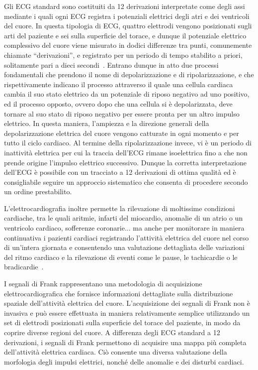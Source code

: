 \documentclass[12pt,italian]{report}
\begin{document}
Gli ECG standard sono costituiti da 12 derivazioni interpretate come degli assi mediante i quali ogni ECG registra i potenziali elettrici degli atri e dei ventricoli del cuore. In questa tipologia di ECG, quattro elettrodi vengono posizionati sugli arti del paziente e sei sulla superficie del torace, e dunque il potenziale elettrico complessivo del cuore viene misurato in dodici differenze tra punti, comunemente chiamate ``derivazioni'', e registrato per un periodo di tempo stabilito a priori, solitamente pari a dieci secondi~\cite{ecg}. Entrano dunque in atto due processi fondamentali che prendono il nome di depolarizzazione e di ripolarizzazione, e che rispettivamente indicano il processo attraverso il quale una cellula cardiaca cambia il suo stato elettrico da un potenziale di riposo negativo ad uno positivo, ed il processo opposto, ovvero dopo che una cellula si è depolarizzata, deve tornare al suo stato di riposo negativo per essere pronta per un altro impulso elettrico. In questa maniera, l'ampiezza e la direzione generali della depolarizzazione elettrica del cuore vengono catturate in ogni momento e per tutto il ciclo cardiaco. Al termine della ripolarizzazione invece, vi è un periodo di inattività elettrica per cui la traccia dell'ECG rimane isoelettrica fino a che non prende origine l'impulso elettrico successivo. Dunque la corretta interpretazione dell'ECG è possibile con un tracciato a 12 derivazioni di ottima qualità ed è consigliabile seguire un approccio sistematico che consenta di procedere secondo un ordine prestabilito.

L'elettrocardiografia inoltre permette la rilevazione di moltissime condizioni cardiache, tra le quali aritmie, infarti del miocardio, anomalie di un atrio o un ventricolo cardiaco, sofferenze coronarie... ma anche per monitorare in maniera continuativa i pazienti cardiaci registrando l'attività elettrica del cuore nel corso di un'intera giornata e consentendo una valutazione dettagliata delle variazioni del ritmo cardiaco e la rilevazione di eventi come le pause, le tachicardie o le bradicardie~\cite{classification}.

I segnali di Frank rappresentano una metodologia di acquisizione elettrocardiografica che fornisce informazioni dettagliate sulla distribuzione spaziale dell'attività elettrica del cuore. L'acquisizione dei segnali di Frank non è invasiva e può essere effettuata in maniera relativamente semplice utilizzando un set di elettrodi posizionati sulla superficie del torace del paziente, in modo da coprire diverse regioni del cuore. A differenza degli ECG standard a 12 derivazioni, i segnali di Frank permettono di acquisire una mappa più completa dell'attività elettrica cardiaca. Ciò consente una diversa valutazione della morfologia degli impulsi elettrici, nonché delle anomalie e dei disturbi cardiaci.
\end{document}

